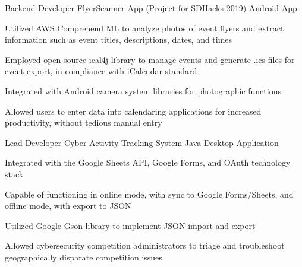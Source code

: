 

\begin{cventries}

  \cventry
    {Backend Developer} %
    {FlyerScanner App (Project for SDHacks 2019)} %
    {Android App} %
    {} %
    {
      \begin{cvitems} %
        \item {Utilized AWS Comprehend ML to analyze photos of event flyers and extract information such as event titles, descriptions, dates, and times}
        \item {Employed open source ical4j library to manage events and generate .ics files for event export, in compliance with iCalendar standard}
        \item {Integrated with Android camera system libraries for photographic functions}
        \item {Allowed users to enter data into calendaring applications for increased productivity, without tedious manual entry}
      \end{cvitems}
    }
    
  \cventry
    {Lead Developer} %
    {Cyber Activity Tracking System} %
    {Java Desktop Application} %
    {} %
    {
      \begin{cvitems} %
        \item {Integrated with the Google Sheets API, Google Forms, and OAuth technology stack}
        \item {Capable of functioning in online mode, with sync to Google Forms/Sheets, and offline mode, with export to JSON}
        \item {Utilized Google Gson library to implement JSON import and export}
        \item {Allowed cybersecurity competition administrators to triage and troubleshoot geographically disparate competition issues}
      \end{cvitems}
    }
    
\end{cventries}